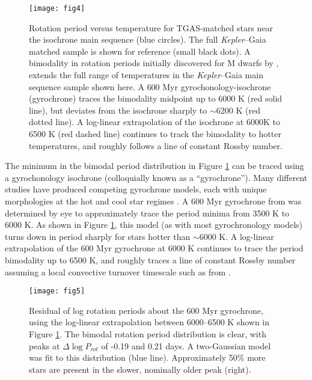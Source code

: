 \documentclass[manuscript, letterpaper]{aastex6}
\newcommand{\Kepler}{\textsl{Kepler}\xspace}
\begin{document}
\begin{figure}[]
\centering
\texttt{[image: fig4]}
\caption{ Rotation period versus temperature for TGAS-matched stars near the isochrone main sequence (blue circles). 
The full \Kepler--Gaia matched sample is shown for reference (small black dots). A bimodality in rotation periods initially discovered for M dwarfs by \citet{mcquillan2013}, extends the full range of temperatures in the \Kepler--Gaia main sequence sample shown here.
A \citet{meibom2011} 600 Myr gyrochonology-isochrone (gyrochrone) traces the bimodality midpoint up to 6000 K (red solid line), but deviates from the isochrone sharply to $\sim$6200 K (red dotted line). A log-linear extrapolation of the isochrone at 6000K to 6500 K (red dashed line) continues to track the bimodality to hotter temperatures, and roughly follows a line of constant Rossby number. 
}
\label{fig:gyro}
\end{figure}



The minimum in the bimodal period distribution in Figure \ref{fig:gyro} can be traced using a gyrochonology isochrone (colloquially known as a ``gyrochrone'').  Many different studies have produced competing gyrochrone models, each with unique morphologies at the hot and cool star regimes \citep[e.g.][]{barnes2007,mamajek2008,meibom2011,angus2015}. A 600 Myr gyrochrone from \citet{meibom2011} was determined by eye to approximately trace the period minima from 3500 K to 6000 K. As shown in Figure \ref{fig:gyro}, this model (as with most gyrochronology models) turns down in period sharply for stars hotter than $\sim$6000 K. A log-linear extrapolation of the 600 Myr gyrochrone at 6000 K continues to trace the period bimodality up to 6500 K, and roughly traces a line of constant Rossby number assuming a local convective turnover timescale such as from \citet{barnes_kim2010}. 



\begin{figure}[]
\centering
\texttt{[image: fig5]}
\caption{Residual of log rotation periods about the \citet{meibom2011} 600 Myr gyrochrone, using the log-linear extrapolation between 6000--6500 K shown in Figure \ref{fig:gyro}. The bimodal rotation period distribution is clear, with peaks at $\Delta \log P_{rot}$ of -0.19 and 0.21 days. A two-Gaussian model was fit to this distribution (blue line).
Approximately 50\% more stars are present in the slower, nominally older peak (right).}
\label{fig:diff}
\end{figure}
\end{document}
